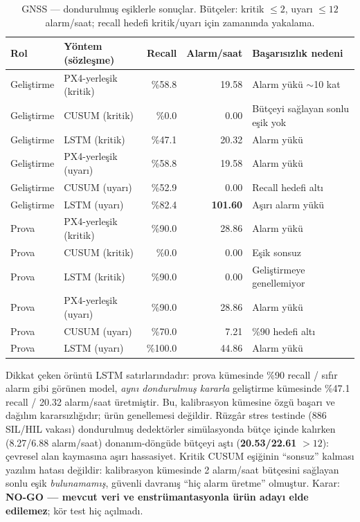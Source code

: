 \documentclass[11pt,a4paper]{article}
\begin{document}
\begin{table}[h]
\centering\small
\caption{GNSS --- dondurulmuş eşiklerle sonuçlar. Bütçeler: kritik $\leq 2$,
uyarı $\leq 12$ alarm/saat; recall hedefi kritik/uyarı için zamanında yakalama.}
\label{tab:gnss-sonuclar}
\begin{tabular}{llrrl}
\toprule
Rol & Yöntem (sözleşme) & Recall & Alarm/saat & Başarısızlık nedeni \\
\midrule
Geliştirme & PX4-yerleşik (kritik) & \%58.8 & 19.58 & Alarm yükü $\sim$10 kat \\
Geliştirme & CUSUM (kritik) & \%0.0 & 0.00 & Bütçeyi sağlayan sonlu eşik yok \\
Geliştirme & LSTM (kritik) & \%47.1 & 20.32 & Alarm yükü \\
Geliştirme & PX4-yerleşik (uyarı) & \%58.8 & 19.58 & Alarm yükü \\
Geliştirme & CUSUM (uyarı) & \%52.9 & 0.00 & Recall hedefi altı \\
Geliştirme & LSTM (uyarı) & \%82.4 & \textbf{101.60} & Aşırı alarm yükü \\
Prova & PX4-yerleşik (kritik) & \%90.0 & 28.86 & Alarm yükü \\
Prova & CUSUM (kritik) & \%0.0 & 0.00 & Eşik sonsuz \\
Prova & LSTM (kritik) & \%90.0 & 0.00 & Geliştirmeye genellemiyor \\
Prova & PX4-yerleşik (uyarı) & \%90.0 & 28.86 & Alarm yükü \\
Prova & CUSUM (uyarı) & \%70.0 & 7.21 & \%90 hedefi altı \\
Prova & LSTM (uyarı) & \%100.0 & 44.86 & Alarm yükü \\
\bottomrule
\end{tabular}
\end{table}

Dikkat çeken örüntü LSTM satırlarındadır: prova kümesinde \%90 recall / sıfır
alarm gibi görünen model, \emph{aynı dondurulmuş kararla} geliştirme kümesinde
\%47.1 recall / 20.32 alarm/saat üretmiştir. Bu, kalibrasyon kümesine özgü
başarı ve dağılım kararsızlığıdır; ürün genellemesi değildir. Rüzgâr stres
testinde (886 SIL/HIL vakası) dondurulmuş dedektörler simülasyonda bütçe içinde
kalırken (8.27/6.88 alarm/saat) donanım-döngüde bütçeyi aştı
(\textbf{20.53/22.61} $> 12$): çevresel alan kaymasına aşırı hassasiyet.
Kritik CUSUM eşiğinin ``sonsuz'' kalması yazılım hatası değildir: kalibrasyon
kümesinde 2 alarm/saat bütçesini sağlayan sonlu eşik \emph{bulunamamış}, güvenli
davranış ``hiç alarm üretme'' olmuştur. Karar: \textbf{NO-GO --- mevcut veri ve
enstrümantasyonla ürün adayı elde edilemez}; kör test hiç açılmadı.
\end{document}
